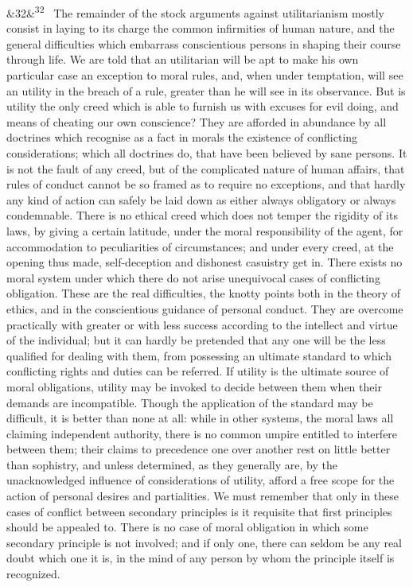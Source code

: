 \documentclass[12pt]{article}
\newcommand{\para}[1][]{\par\noindent\ifx&#1&\else\textsuperscript{\footnotesize #1}~\fi}
\begin{document}
\para[32] The remainder of the stock arguments against utilitarianism mostly consist in laying to its charge the common infirmities of human nature, and the general difficulties which embarrass conscientious persons in shaping their course through life. We are told that an utilitarian will be apt to make his own particular case an exception to moral rules, and, when under temptation, will see an utility in the breach of a rule, greater than he will see in its observance. But is utility the only creed which is able to furnish us with excuses for evil doing, and means of cheating our own conscience? They are afforded in abundance by all doctrines which recognise as a fact in morals the existence of conflicting considerations; which all doctrines do, that have been believed by sane persons. It is not the fault of any creed, but of the complicated nature of human affairs, that rules of conduct cannot be so framed as to require no exceptions, and that hardly any kind of action can safely be laid down as either always obligatory or always condemnable. There is no ethical creed which does not temper the rigidity of its laws, by giving a certain latitude, under the moral responsibility of the agent, for accommodation to peculiarities of circumstances; and under every creed, at the opening thus made, self-deception and dishonest casuistry get in. There exists no moral system under which there do not arise unequivocal cases of conflicting obligation. These are the real difficulties, the knotty points both in the theory of ethics, and in the conscientious guidance of personal conduct. They are overcome practically with greater or with less success according to the intellect and virtue of the individual; but it can hardly be pretended that any one will be the less qualified for dealing with them, from possessing an ultimate standard to which conflicting rights and duties can be referred. If utility is the ultimate source of moral obligations, utility may be invoked to decide between them when their demands are incompatible. Though the application of the standard may be difficult, it is better than none at all: while in other systems, the moral laws all claiming independent authority, there is no common umpire entitled to interfere between them; their claims to precedence one over another rest on little better than sophistry, and unless determined, as they generally are, by the unacknowledged influence of considerations of utility, afford a free scope for the action of personal desires and partialities. We must remember that only in these cases of conflict between secondary principles is it requisite that first principles should be appealed to. There is no case of moral obligation in which some secondary principle is not involved; and if only one, there can seldom be any real doubt which one it is, in the mind of any person by whom the principle itself is recognized.
\end{document}

